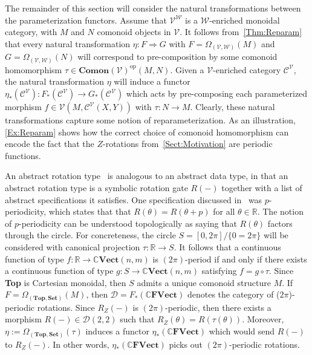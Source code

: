 The remainder of this section will consider the natural transformations between the parameterization functors.
Assume that $\mathcal{V}^{\mathcal{W}}$ is a $\mathcal{W}$-enriched monoidal category, with $M$ and $N$ comonoid objects in $\mathcal{V}$.
It follows from~\cref{Thm:Reparam} that every natural transformation $\eta: F \Rightarrow G$ with $F = \Omega_{(\mathcal{V},\mathcal{W})}( M )$ and $G = \Omega_{(\mathcal{V},\mathcal{W})}( N )$ will correspond to pre-composition by some comonoid homomorphism $\tau \in \mathbf{Comon}( \mathcal{V} )^{\text{op}}( M, N )$.
Given a $\mathcal{V}$-enriched category $\mathcal{C}^{\mathcal{V}}$, the natural transformation $\eta$ will induce a functor $\eta_*( \mathcal{C}^{\mathcal{V}} ): F_*( \mathcal{C}^{\mathcal{V}} ) \to G_*( \mathcal{C}^{\mathcal{V}} )$ which acts by pre-composing each parameterized morphism $f \in \mathcal{V}( M, \mathcal{C}^{\mathcal{V}}( X, Y ) )$ with $\tau: N \to M$.
Clearly, these natural transformations capture some notion of reparameterization.
As an illustration, \cref{Ex:Reparam} shows how the correct choice of comonoid homomorphism can encode the fact that the $Z$-rotations from~\cref{Sect:Motivation} are periodic functions.

\begin{exa}
    \label{Ex:Reparam}
    An abstract rotation type~\cite{Wesley2024} is analogous to an abstract data type, in that an abstract rotation type is a symbolic rotation gate $R( - )$ together with a list of abstract specifications it satisfies.
    One specification discussed in~\cite{Wesley2024} was $p$-periodicity, which states that that $R( \theta ) = R( \theta + p )$ for all $\theta \in \mathbb{R}$.
    The notion of $p$-periodicity can be understood topologically as saying that $R( \theta )$ factors through the circle.
    For concreteness, the circle $S = [0,2\pi] / \{ 0 = 2\pi \}$ will be considered with canonical projection $\tau: \mathbb{R} \to S$.
    It follows that a continuous function of type $f: \mathbb{R} \to \mathbb{C}\mathbf{Vect}( n, m )$ is $(2\pi)$-period if and only if there exists a continuous function of type $g: S \to \mathbb{C}\mathbf{Vect}( n, m )$ satisfying $f = g \circ \tau$.
    Since \textbf{Top} is Cartesian monoidal, then $S$ admits a unique comonoid structure $M$.
    If $F = \Omega_{(\textbf{Top},\textbf{Set})}( M )$, then $\mathcal{D} = F_*( \mathbb{C}\textbf{FVect} )$ denotes the category of ($2\pi$)-periodic rotations.
    Since $R_Z( - )$ is $(2\pi)$-periodic, then there exists a morphism $R( - ) \in \mathcal{D}( 2, 2 )$ such that $R_Z( \theta ) = R( \tau( \theta ) )$.
    Moreover, $\eta := \Omega_{(\textbf{Top},\textbf{Set})}( \tau )$ induces a functor $\eta_*( \mathbb{C}\mathbf{FVect} )$ which would send $R( - )$ to $R_Z( - )$.
    In other words, $\eta_*( \mathbb{C}\mathbf{FVect} )$ picks out $(2\pi)$-periodic rotations.
\end{exa}

